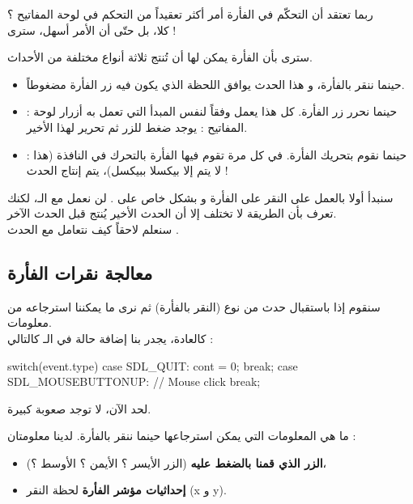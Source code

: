 ربما تعتقد أن التحكّم في الفأرة أمر أكثر تعقيداً من التحكم في لوحة المفاتيح ؟\\
كلا، بل حتّى أن الأمر أسهل، سترى !

سترى بأن الفأرة يمكن لها أن تُنتج ثلاثة أنواع مختلفة من الأحداث.

\begin{itemize}
	\item {}
	حينما ننقر بالفأرة، و هذا الحدث يوافق اللحظة الذي يكون فيه زر الفأرة مضغوطاً.
	\item {} :
	حينما نحرر زر الفأرة. كل هذا يعمل وفقاً لنفس المبدأ التي تعمل به أزرار لوحة المفاتيح : يوجد ضغط للزر ثم تحرير لهذا الأخير.
	\item {} :
	حينما نقوم بتحريك الفأرة. في كل مرة تقوم فيها الفأرة بالتحرك في النافذة (هذا لا يتم إلا بيكسلا ببيكسل)، يتم إنتاج الحدث 
	 !
\end{itemize}
 
سنبدأ أولا بالعمل على النقر على الفأرة و بشكل خاص على
.
لن نعمل مع الـ،
لكنك تعرف بأن الطريقة لا تختلف إلا أن الحدث الأخير يُنتج قبل الحدث الآخر.\\
سنعلم لاحقاً كيف نتعامل مع الحدث
.

\subsection{معالجة نقرات الفأرة}

سنقوم إذا باستقبال حدث من نوع
(النقر بالفأرة) ثم نرى ما يمكننا استرجاعه من معلومات.\\
كالعادة، يجدر بنا إضافة حالة
في الـ
كالتالي :

\begin{Csource}
switch(event.type)
{
	case SDL_QUIT:
	cont = 0;
	break;
	case SDL_MOUSEBUTTONUP: // Mouse click
	break;
} 
\end{Csource}

لحد الآن، لا توجد صعوبة كبيرة.

ما هي المعلومات التي يمكن استرجاعها حينما ننقر بالفأرة. لدينا معلومتان :

\begin{itemize}
	\item \textbf{الزر الذي قمنا بالضغط عليه}
	 (الزر الأيسر ؟ الأيمن ؟ الأوسط ؟)،
	\item \textbf{إحداثيات مؤشر الفأرة}
	 لحظة النقر 
	(\textenglish{x}
	و
	\textenglish{y}).
\end{itemize}

